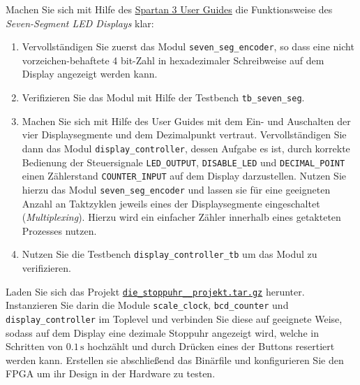 \documentclass[12pt]{article}
\begin{document}


Machen Sie sich mit Hilfe des \textcolor{blue}{\href{https://www.xilinx.com/support/documentation/boards_and_kits/ug130.pdf}{Spartan 3 User Guides}} die Funktionsweise des \textit{Seven-Segment LED Displays} klar:


\begin{enumerate}[label=\alph*.)]


\item Vervollständigen Sie zuerst das Modul \texttt{seven\_seg\_encoder}, so dass eine nicht vorzeichen-behaftete 4 bit-Zahl in hexadezimaler Schreibweise auf dem Display angezeigt werden kann.


\item Verifizieren Sie das Modul mit Hilfe der Testbench \texttt{tb\_seven\_seg}.


\item Machen Sie sich mit Hilfe des User Guides mit dem Ein- und Auschalten der vier Displaysegmente und dem Dezimalpunkt vertraut.
Vervollständigen Sie dann das Modul \texttt{display\_controller}, dessen Aufgabe es ist, durch korrekte Bedienung der Steuersignale \texttt{LED\_OUTPUT}, \texttt{DISABLE\_LED} und \texttt{DECIMAL\_POINT} einen Zählerstand \texttt{COUNTER\_INPUT} auf dem Display darzustellen.
Nutzen Sie hierzu das Modul \texttt{seven\_seg\_encoder} und lassen sie für eine geeigneten Anzahl an Taktzyklen jeweils
eines der Displaysegmente eingeschaltet (\textit{Multiplexing}).
Hierzu wird ein einfacher Zähler innerhalb eines getakteten Prozesses nutzen.


\item Nutzen Sie die Testbench \texttt{display\_controller\_tb} um das Modul zu verifizieren.


\end{enumerate}







Laden Sie sich das Projekt \textcolor{blue}{\href{https://ilias.uni-freiburg.de/goto.php?target=file_2292546_download&client_id=unifreiburg}{\texttt{die\_stoppuhr\_\_projekt.tar.gz}}} herunter. Instanzieren Sie darin die Module \texttt{scale\_clock}, \texttt{bcd\_counter} und \texttt{display\_controller} im Toplevel und verbinden Sie diese auf geeignete Weise,
sodass auf dem Display eine dezimale Stoppuhr angezeigt wird, welche in Schritten von $0.1\,\mathrm{s}$ hochzählt und durch Drücken eines der Buttons resertiert werden kann.
Erstellen sie abschließend das Binärfile und konfigurieren Sie den FPGA um ihr Design in der Hardware zu testen.
\end{document}
